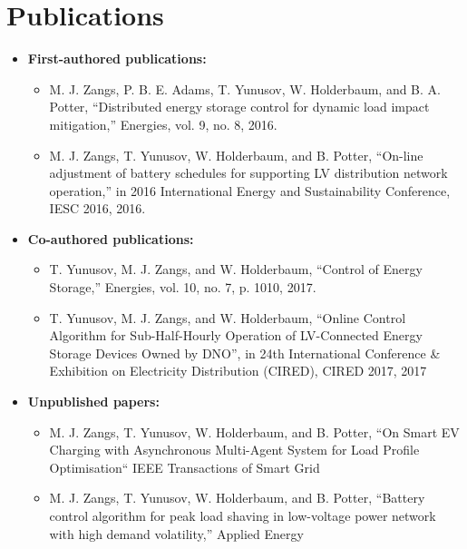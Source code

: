 \section{Publications}
\label{ch-introduction:sec:publications}


\begin{itemize}

\item \textbf{First-authored publications:}
\begin{itemize}
	\item M. J. Zangs, P. B. E. Adams, T. Yunusov, W. Holderbaum, and B. A. Potter, ``Distributed energy storage control for dynamic load impact mitigation,'' Energies, vol. 9, no. 8, 2016.
	\item M. J. Zangs, T. Yunusov, W. Holderbaum, and B. Potter, ``On-line adjustment of battery schedules for supporting LV distribution network operation,'' in 2016 International Energy and Sustainability Conference, IESC 2016, 2016.
\end{itemize}

\item \textbf{Co-authored publications:}
\begin{itemize}
	\item T. Yunusov, M. J. Zangs, and W. Holderbaum, ``Control of Energy Storage,'' Energies, vol. 10, no. 7, p. 1010, 2017.
	\item T. Yunusov, M. J. Zangs, and W. Holderbaum, ``Online Control Algorithm for Sub-Half-Hourly Operation of LV-Connected Energy Storage Devices Owned by DNO'', in 24th International Conference \& Exhibition on Electricity Distribution (CIRED), CIRED 2017, 2017
\end{itemize}

\item \textbf{Unpublished papers:}
\begin{itemize}
	\item M. J. Zangs, T. Yunusov, W. Holderbaum, and B. Potter, ``On Smart EV Charging with Asynchronous Multi-Agent System for Load Profile Optimisation`` IEEE Transactions of Smart Grid
	\item M. J. Zangs, T. Yunusov, W. Holderbaum, and B. Potter, ``Battery control algorithm for peak load shaving in low-voltage power network with high demand volatility,'' Applied Energy
\end{itemize}

\end{itemize}




